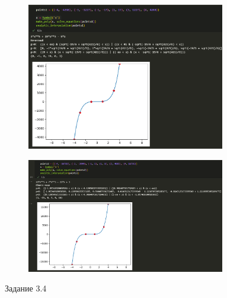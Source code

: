 \documentclass[14pt,a4paper]{extarticle}
\begin{document}
\begin{figure}[ht!]
    \begin{subfigure}{.5\textwidth}
        \centering
        \includegraphics[width=0.95\textwidth]{figures/3.4-1-1.png}
    \end{subfigure}%
    \begin{subfigure}{.5\textwidth}
        \centering
        \includegraphics[width=0.95\textwidth]{figures/3.4-1-2.png}
    \end{subfigure}
    \caption{Задание 3.4}
    \label{fig:3.4block1}
\end{figure}
\end{document}
